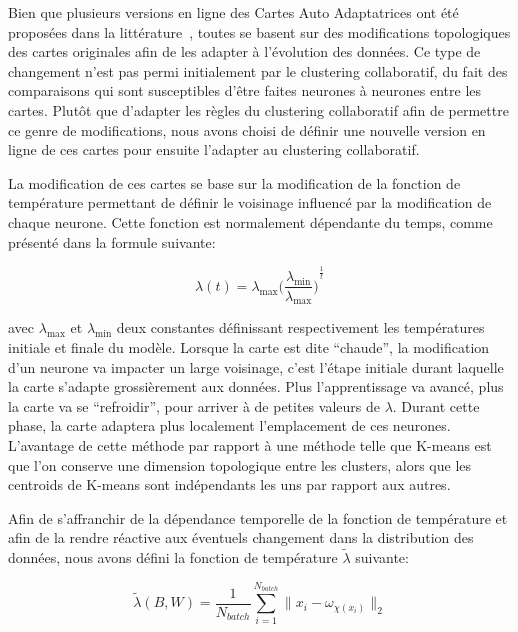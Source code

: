 Bien que plusieurs versions en ligne des Cartes Auto Adaptatrices ont été proposées dans la littérature~\cite{deng2000esom,paplinski2012incremental}, toutes se basent sur des modifications topologiques des cartes originales afin de les adapter à l'évolution des données. Ce type de changement n'est pas permi initialement par le clustering collaboratif, du fait des comparaisons qui sont susceptibles d'\^{e}tre faites neurones à neurones entre les cartes. Plutôt que d'adapter les règles du clustering collaboratif afin de permettre ce genre de modifications, nous avons choisi de définir une nouvelle version en ligne de ces cartes pour ensuite l'adapter au clustering collaboratif.

La modification de ces cartes se base sur la modification de la fonction de température permettant de définir le voisinage influencé par la modification de chaque neurone. Cette fonction est normalement dépendante du temps, comme présenté dans la formule suivante:

\begin{equation}
\lambda(t) = \lambda_{\max}{\Big(\frac{\lambda_{\min}}{\lambda_{\max}}\Big)}^{\frac{1}{t}}
\end{equation}

    avec $\lambda_{\max}$ et $\lambda_{\min}$ deux constantes définissant respectivement les températures initiale et finale du modèle. Lorsque la carte est dite ``chaude'', la modification d'un neurone va impacter un large voisinage, c'est l'étape initiale durant laquelle la carte s'adapte grossièrement aux données. Plus l'apprentissage va avancé, plus la carte va se ``refroidir'', pour arriver à de petites valeurs de $\lambda$. Durant cette phase, la carte adaptera plus localement l'emplacement de ces neurones. L'avantage de cette méthode par rapport à une méthode telle que K-means est que l'on conserve une dimension topologique entre les clusters, alors que les centroids de K-means sont indépendants les uns par rapport aux autres.

Afin de s'affranchir de la dépendance temporelle de la fonction de température et afin de la rendre réactive aux éventuels changement dans la distribution des données, nous avons défini la fonction de température $\widetilde{\lambda}$ suivante:

	\begin{equation}
        \widetilde{\lambda}(B, W) = \frac{1}{N_{batch}}\sum_{i=1}^{N_{batch}}\|x_i - \omega_{\chi(x_i)}\|_2
	\end{equation}


